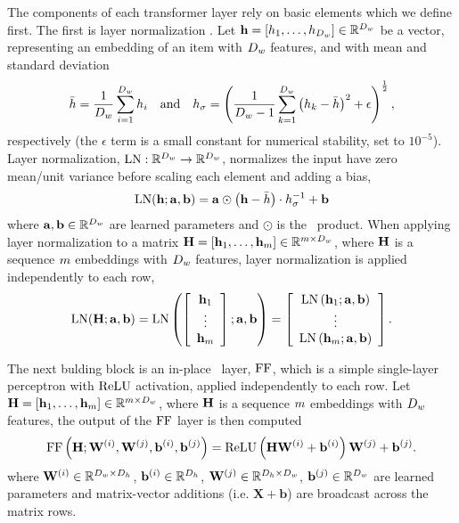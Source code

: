The components of each transformer layer rely on basic elements which we define
first. The first is layer normalization
 \cite{ba2016}.
 Let $\mathbf{h} = \left[h_1,\ldots,h_{D_{w}}\right] \in \mathbb{R}^{{D_{w}}}$ be a vector, representing
 an embedding of an item with ${D_{w}}$ features, and with mean and standard deviation
\[\bar{h}= \frac{1}{{D_{w}}} \sum_{i=1}^{D_{w}} h_i
    \quad \textrm{and} \quad
  h_\sigma = \left(
      \frac{1}{{D_{w}}-1} \sum_{k=1}^{D_{w}} \left( 
  h_k - \bar{h} \right)^2  + \epsilon\right)^\frac{1}{2},\]
  respectively 
  (the $\epsilon$ term is a small constant for numerical stability,
  set to $10^{-5}$).
Layer normalization, 
$\operatorname{LN} : \mathbb{R}^{{D_{w}}} \rightarrow \mathbb{R}^{{D_{w}}}$,
normalizes the input have zero mean/unit variance before scaling each element
and adding a bias,
\[\operatorname{LN}(\mathbf{h}; \mathbf{a}, \mathbf{b}) = \mathbf{a} \odot \left(\mathbf{h} - \bar{h}\right) \cdot h_\sigma^{-1} + \mathbf{b} \]
where $\mathbf{a}, \mathbf{b} \in \mathbb{R}^{{D_{w}}}$ are learned parameters
and $\odot$ is the \elementwise~product.
When applying layer normalization to a matrix $\mathbf{H} =\left[\mathbf{h}_1,\ldots,\mathbf{h}_{m} \right]\in \mathbb{R}^{m \times {D_{\ensuremath{w}}}}$, where $\mathbf{H}$ is a sequence $m$ embeddings
with ${D_{w}}$ features, layer normalization is applied independently to 
each row,
\[ \operatorname{LN}(\mathbf{H};\mathbf{a}, \mathbf{b}) = \operatorname{LN}\left( \left[ \begin{array}{c}\mathbf{h}_1 \\ \vdots \\ \mathbf{h}_{m}  \end{array} \right]; \mathbf{a}, \mathbf{b}\right) =  \left[ \begin{array}{c} \operatorname{LN}\left( \mathbf{h}_1;\mathbf{a},\mathbf{b}\right) \\ \vdots \\ \operatorname{LN}\left( \mathbf{h}_{m};\mathbf{a},\mathbf{b}\right)  \end{array} \right].  \]

The next bulding block is an in-place \feedforward~layer, $\operatorname{FF}$, which is a simple single-layer perceptron  with $\operatorname{ReLU}$ activation, applied independently 
to each row. Let $\mathbf{H} =\left[\mathbf{h}_1,\ldots,\mathbf{h}_{m} \right]\in \mathbb{R}^{m \times {D_{\ensuremath{w}}}}$, where $\mathbf{H}$ is a sequence $m$ embeddings
with ${D_{w}}$ features, the output of the $\operatorname{FF}$ layer is then computed
\[\operatorname{FF}\left(\mathbf{H};\mathbf{W}^{(i)},\mathbf{W}^{(j)},\mathbf{b}^{(i)},\mathbf{b}^{(j)}\right) = 
\operatorname{ReLU}\left(\mathbf{H}\mathbf{W}^{(i)} + \mathbf{b}^{(i)}\right)\mathbf{W}^{(j)} + \mathbf{b}^{(j)}.     \]
where $\mathbf{W}^{(i)} \in \mathbb{R}^{D_{w} \times D_{h}}$, $\mathbf{b}^{(i)} \in \mathbb{R}^{D_{h}}$,
$\mathbf{W}^{(j)} \in \mathbb{R}^{D_{h} \times D_{w}}$, $\mathbf{b}^{(j)} \in \mathbb{R}^{D_{w}}$ are learned parameters and 
 matrix-vector additions (i.e. $\mathbf{X} + \mathbf{b}$) are broadcast across  the matrix rows.

